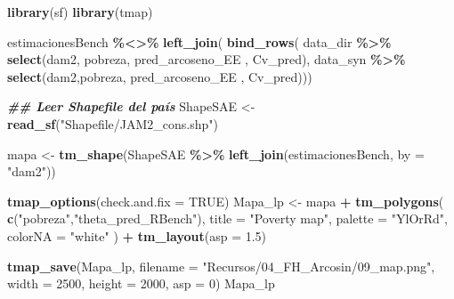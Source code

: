 \documentclass[
  12pt,
]{book}
\newenvironment{Shaded}{\begin{snugshade}}{\end{snugshade}}
\newcommand{\AttributeTok}[1]{\textcolor[rgb]{0.13,0.29,0.53}{#1}}
\newcommand{\ConstantTok}[1]{\textcolor[rgb]{0.56,0.35,0.01}{#1}}
\newcommand{\DecValTok}[1]{\textcolor[rgb]{0.00,0.00,0.81}{#1}}
\newcommand{\DocumentationTok}[1]{\textcolor[rgb]{0.56,0.35,0.01}{\textbf{\textit{#1}}}}
\newcommand{\FloatTok}[1]{\textcolor[rgb]{0.00,0.00,0.81}{#1}}
\newcommand{\FunctionTok}[1]{\textcolor[rgb]{0.13,0.29,0.53}{\textbf{#1}}}
\newcommand{\NormalTok}[1]{#1}
\newcommand{\OtherTok}[1]{\textcolor[rgb]{0.56,0.35,0.01}{#1}}
\newcommand{\SpecialCharTok}[1]{\textcolor[rgb]{0.81,0.36,0.00}{\textbf{#1}}}
\newcommand{\StringTok}[1]{\textcolor[rgb]{0.31,0.60,0.02}{#1}}
\begin{document}
\begin{Shaded}
\begin{Highlighting}[]
\FunctionTok{library}\NormalTok{(sf)}
\FunctionTok{library}\NormalTok{(tmap)}

\NormalTok{estimacionesBench }\SpecialCharTok{\%\textless{}\textgreater{}\%} \FunctionTok{left\_join}\NormalTok{(}
\FunctionTok{bind\_rows}\NormalTok{(}
\NormalTok{data\_dir }\SpecialCharTok{\%\textgreater{}\%} \FunctionTok{select}\NormalTok{(dam2, pobreza, pred\_arcoseno\_EE , Cv\_pred),}
\NormalTok{data\_syn }\SpecialCharTok{\%\textgreater{}\%} \FunctionTok{select}\NormalTok{(dam2,pobreza, pred\_arcoseno\_EE , Cv\_pred)))}

\DocumentationTok{\#\# Leer Shapefile del país}
\NormalTok{ShapeSAE }\OtherTok{\textless{}{-}} \FunctionTok{read\_sf}\NormalTok{(}\StringTok{"Shapefile/JAM2\_cons.shp"}\NormalTok{)}


\NormalTok{mapa }\OtherTok{\textless{}{-}} \FunctionTok{tm\_shape}\NormalTok{(ShapeSAE }\SpecialCharTok{\%\textgreater{}\%}
                   \FunctionTok{left\_join}\NormalTok{(estimacionesBench,  }\AttributeTok{by =} \StringTok{"dam2"}\NormalTok{))}

\FunctionTok{tmap\_options}\NormalTok{(}\AttributeTok{check.and.fix =} \ConstantTok{TRUE}\NormalTok{)}
\NormalTok{Mapa\_lp }\OtherTok{\textless{}{-}}
\NormalTok{  mapa }\SpecialCharTok{+} \FunctionTok{tm\_polygons}\NormalTok{(}
    \FunctionTok{c}\NormalTok{(}\StringTok{"pobreza"}\NormalTok{,}\StringTok{"theta\_pred\_RBench"}\NormalTok{),}
    \AttributeTok{title =} \StringTok{"Poverty map"}\NormalTok{,}
    \AttributeTok{palette =} \StringTok{"YlOrRd"}\NormalTok{,}
    \AttributeTok{colorNA =} \StringTok{"white"}
\NormalTok{  ) }\SpecialCharTok{+} \FunctionTok{tm\_layout}\NormalTok{(}\AttributeTok{asp =} \FloatTok{1.5}\NormalTok{)}

\FunctionTok{tmap\_save}\NormalTok{(Mapa\_lp, }
          \AttributeTok{filename =} \StringTok{"Recursos/04\_FH\_Arcosin/09\_map.png"}\NormalTok{,}
           \AttributeTok{width =} \DecValTok{2500}\NormalTok{,}
  \AttributeTok{height =} \DecValTok{2000}\NormalTok{,}
  \AttributeTok{asp =} \DecValTok{0}\NormalTok{)}
\NormalTok{Mapa\_lp}
\end{Highlighting}
\end{Shaded}
\end{document}
